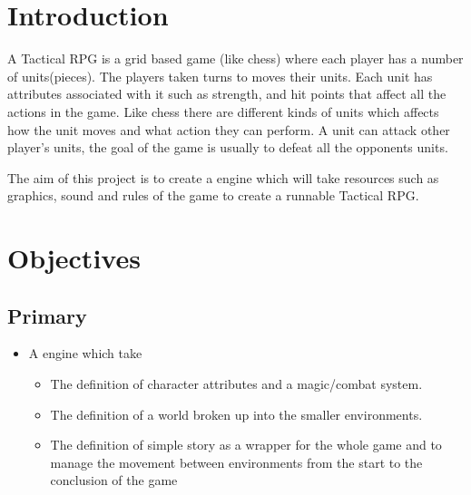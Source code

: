 \documentclass[11pt]{article}
\title{\mytitle}
\author{Bilal Hussain}
\begin{document}
\maketitle


\section{Introduction}
\label{introduction}

A Tactical RPG is a grid based game (like chess) where each player has a number of units(pieces). The players taken turns to moves their units. Each unit has attributes associated with it such as strength, and hit points that affect all the actions in the game. Like chess there are different kinds of units which affects how the unit moves and what action they can perform. A unit can attack other player's units, the goal of the game is usually to defeat all the opponents units. 

The aim of this project is to create a engine which will take resources such as graphics, sound and rules of the game to create a runnable Tactical RPG.

\section{Objectives}
\label{objectives}

\subsection{Primary}
\label{primary}

\begin{itemize}
\item A engine which take

\begin{itemize}
\item The definition of character attributes and a magic\slash combat system.

\item The definition of a world broken up into the smaller environments.

\item The definition of simple story as a wrapper for the whole game and to
manage the movement between environments from the start to the
conclusion of the game

\end{itemize}

\end{itemize}
\end{document}
